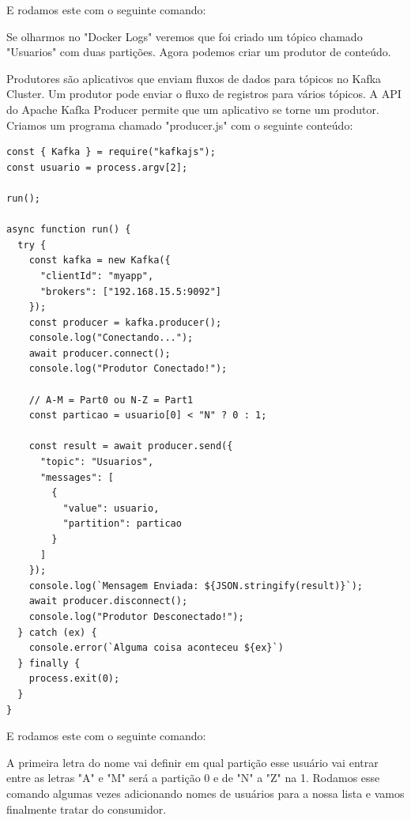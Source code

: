 \documentclass[a4paper,11pt]{article}
\begin{document}
E rodamos este com o seguinte comando:

Se olharmos no "Docker Logs" veremos que foi criado um tópico chamado "Usuarios" com duas partições. 
Agora podemos criar um produtor de conteúdo. 

Produtores são aplicativos que enviam fluxos de dados para tópicos no Kafka Cluster. Um produtor pode enviar o fluxo de registros para vários tópicos. A API do Apache Kafka Producer permite que um aplicativo se torne um produtor. Criamos um programa chamado "producer.js" com o seguinte conteúdo:
\begin{lstlisting}[]
const { Kafka } = require("kafkajs");
const usuario = process.argv[2];

run();

async function run() {
  try {
    const kafka = new Kafka({
      "clientId": "myapp",
      "brokers": ["192.168.15.5:9092"]
    });
    const producer = kafka.producer();
    console.log("Conectando...");
    await producer.connect();
    console.log("Produtor Conectado!");

    // A-M = Part0 ou N-Z = Part1
    const particao = usuario[0] < "N" ? 0 : 1;

    const result = await producer.send({
      "topic": "Usuarios",
      "messages": [
        {
          "value": usuario,
          "partition": particao
        }
      ]
    });
    console.log(`Mensagem Enviada: ${JSON.stringify(result)}`);
    await producer.disconnect();
    console.log("Produtor Desconectado!");
  } catch (ex) {
    console.error(`Alguma coisa aconteceu ${ex}`)
  } finally {
    process.exit(0);
  }
}
\end{lstlisting}

E rodamos este com o seguinte comando:

A primeira letra do nome vai definir em qual partição esse usuário vai entrar entre as letras "A" e "M" será a partição 0 e de "N" a "Z" na 1. Rodamos esse comando algumas vezes adicionando nomes de usuários para a nossa lista e vamos finalmente tratar do consumidor. 
\end{document}
